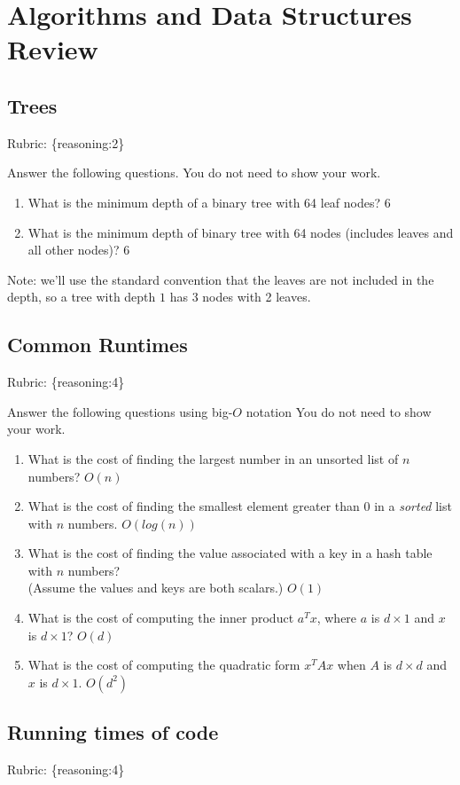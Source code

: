 \documentclass{article}
\def\rubric#1{\gre{Rubric: \{#1\}}}{}
\def\blu#1{{\color{blu}#1}}
\def\gre#1{{\color{gre}#1}}
\def\red#1{{\color{red}#1}}
\begin{document}
\section{Algorithms and Data Structures Review}

\subsection{Trees}
\rubric{reasoning:2}

\blu{Answer the following questions.} You do not need to show your work.

\begin{enumerate}
\item What is the minimum depth of a binary tree with 64 leaf nodes? \red{6}
\item What is the minimum depth of binary tree with 64 nodes (includes leaves and all other nodes)? \red{6}
\end{enumerate}
Note: we'll use the standard convention that the leaves are not included in the depth, so a tree with depth $1$ has 3 nodes with 2 leaves.

\subsection{Common Runtimes}
\rubric{reasoning:4}

\blu{Answer the following questions using big-$O$ notation} You do not need to show your work.
\begin{enumerate}
\item What is the cost of finding the largest number in an unsorted list of $n$ numbers? \red{$O(n)$}
\item What is the cost of finding the smallest element greater than 0 in a \emph{sorted} list with $n$ numbers. \red{$O(log(n))$}
\item What is the cost of finding the value associated with a key in a hash table with $n$ numbers? \\(Assume the values and keys are both scalars.) \red{$O(1)$}
\item What is the cost of computing the inner product $a^Tx$, where $a$ is $d \times 1$ and $x$ is $d \times 1$? \red{$O(d)$}
\item What is the cost of computing the quadratic form $x^TAx$ when $A$ is $d \times d$ and $x$ is $d \times 1$. \red{$O(d^2)$}
\end{enumerate}

\subsection{Running times of code}
\rubric{reasoning:4}
\end{document}
